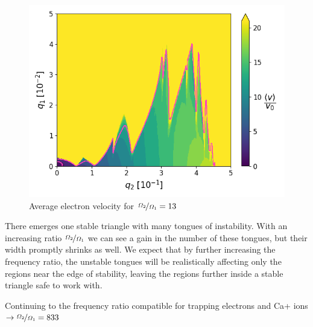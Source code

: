 \begin{figure}[H]
	\centering
	\includegraphics[width=\linewidth]{img/0_ions_1_electrons_q1_0.0-0.05_q2_0.0-0.5_960x960_13_1000.png}
	\caption{Average electron velocity for $\nicefrac{\Omega_2}{\Omega_1} = 13$}
	\label{fig:stabil-eta=13}
\end{figure}

There emerges one stable triangle with many tongues of instability. With an increasing ratio $\nicefrac{\Omega_2}{\Omega_1}$ we can see a gain in the number of these tongues, but their width promptly shrinks as well. We expect that by further increasing the frequency ratio, the unstable tongues will be realistically affecting only the regions near the edge of stability, leaving the regions further inside a stable triangle safe to work with.

Continuing to the frequency ratio compatible for trapping electrons and Ca+ ions $\rightarrow \nicefrac{\Omega_2}{\Omega_1} = 833$

